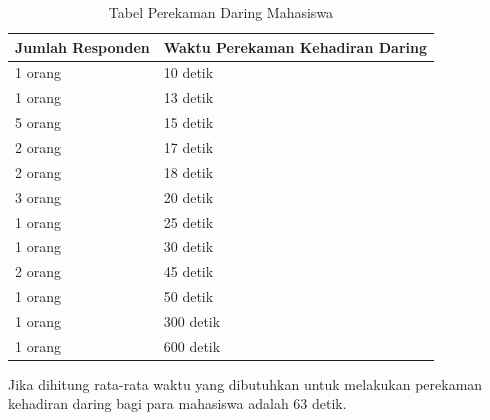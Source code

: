 \documentclass[a4paper,twoside]{article}
\begin{document}
\begin{enumerate}
\begin{enumerate}
			\begin{table}[ht]			
				\caption{Tabel Perekaman Daring Mahasiswa}
				\centering
				\begin{tabular}{|p{4cm} |p{7cm}|}\hline
					Jumlah Responden &  Waktu Perekaman Kehadiran Daring \\ \hline     
					1 orang &  10 detik\\ \hline 
					1 orang &  13 detik\\ \hline 
					5 orang &  15 detik\\ \hline 
					2 orang &  17 detik\\ \hline 
					2 orang &  18 detik\\ \hline 
					3 orang &  20 detik\\ \hline
					1 orang &  25 detik\\ \hline 
					1 orang &  30 detik\\ \hline 
					2 orang &  45 detik\\ \hline
					1 orang &  50 detik\\ \hline 
					1 orang &  300 detik\\ \hline 
					1 orang &  600 detik\\ \hline		
				\end{tabular}
				\label{tab:daringMahasiswa}
			\end{table}
			\newpage
			Jika dihitung rata-rata waktu yang dibutuhkan untuk melakukan perekaman kehadiran daring bagi para mahasiswa adalah 63 detik.
			

\end{enumerate}
\end{enumerate}
\end{document}
